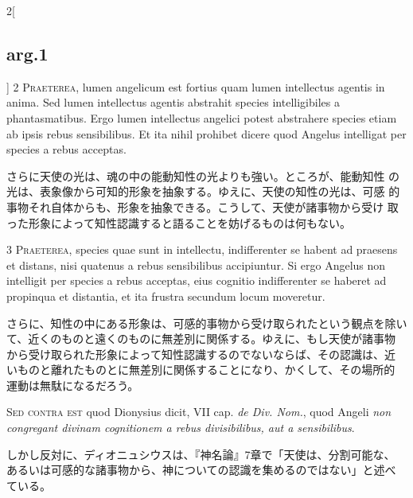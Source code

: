 \documentclass[paper=a4paper,fontsize=10pt,jafontsize=9pt,titlepage]{jlreq}
\begin{document}
\begin{paracol}{2}[\subsection{arg.1}]
{\scshape 2 Praeterea}, lumen angelicum est fortius quam lumen
intellectus agentis in anima. Sed lumen intellectus agentis abstrahit
species intelligibiles a phantasmatibus. Ergo lumen intellectus angelici
potest abstrahere species etiam ab ipsis rebus sensibilibus. Et ita
nihil prohibet dicere quod Angelus intelligat per species a rebus
acceptas.

\switchcolumn

さらに天使の光は、魂の中の能動知性の光よりも強い。ところが、能動知性
 の光は、表象像から可知的形象を抽象する。ゆえに、天使の知性の光は、可感
 的事物それ自体からも、形象を抽象できる。こうして、天使が諸事物から受け
 取った形象によって知性認識すると語ることを妨げるものは何もない。


{\scshape 3 Praeterea}, species quae sunt in intellectu, indifferenter
se habent ad praesens et distans, nisi quatenus a rebus sensibilibus
accipiuntur. Si ergo Angelus non intelligit per species a rebus
acceptas, eius cognitio indifferenter se haberet ad propinqua et
distantia, et ita frustra secundum locum moveretur.

\switchcolumn

さらに、知性の中にある形象は、可感的事物から受け取られたという観点を除い
 て、近くのものと遠くのものに無差別に関係する。ゆえに、もし天使が諸事物
 から受け取られた形象によって知性認識するのでないならば、その認識は、近
 いものと離れたものとに無差別に関係することになり、かくして、その場所的
 運動は無駄になるだろう。

\switchcolumn*[\subsection{s.c.}]

{\scshape  Sed contra est} quod Dionysius dicit, VII cap. {\itshape de Div. Nom.},
quod Angeli {\itshape non congregant divinam cognitionem a rebus divisibilibus,
aut a sensibilibus}.

\switchcolumn

しかし反対に、ディオニュシウスは、『神名論』7章で「天使は、分割可能な、
 あるいは可感的な諸事物から、神についての認識を集めるのではない」と述べ
 ている。



\end{paracol}
\end{document}
